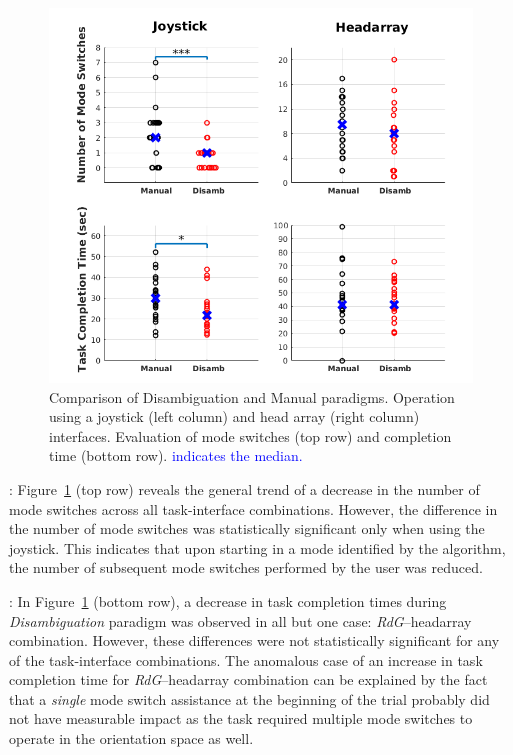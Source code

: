 \documentclass[conference]{IEEEtran}
\begin{document}
	\begin{figure}[t]
	\centering
	\includegraphics[width = 1.1\hsize,center]{./figures/FINAL_PLOT.png}
	\vspace{-0.7cm}
	\caption{Comparison of Disambiguation and Manual paradigms. Operation using a joystick (left column) and head array (right column) interfaces. Evaluation of mode switches (top row) and completion time (bottom row). \textcolor{blue}{{} indicates the median.}}
	\label{DATAPLOT}
\end{figure}
\vspace{0.1cm}
: Figure~\ref{DATAPLOT} (top row) reveals the general trend of a decrease in the number of mode switches across all task-interface combinations. However, the difference in the number of mode switches was statistically significant only when using the joystick. This indicates that upon starting in a mode identified by the algorithm, the number of subsequent mode switches performed by the user was reduced. 

\vspace{0.1cm}
: In Figure~\ref{DATAPLOT} (bottom row), a decrease in task completion times during \textit{Disambiguation} paradigm was observed in all but one case: \textit{RdG}--headarray combination. However, these differences were not statistically significant for any of the task-interface combinations. The anomalous case of an increase in task completion time for \textit{RdG}--headarray combination can be explained by the fact that a \textit{single} mode switch assistance at the beginning of the trial probably did not have measurable impact as the task required multiple mode switches to operate in the orientation space as well.
\end{document}
